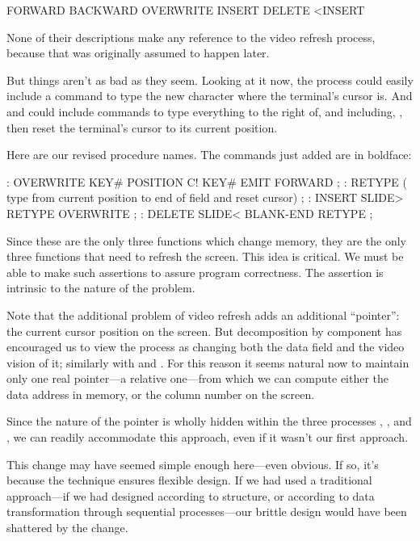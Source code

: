 \begin{Code}
FORWARD
BACKWARD
OVERWRITE
INSERT
DELETE
<INSERT
\end{Code}

None of their descriptions make any reference to the video refresh
process, because that was originally assumed to happen later.

But things aren't as bad as they seem. Looking at it now, the process
 could easily include a command to type the new character
where the terminal's cursor is. And  and  could include
commands to type everything to the right of, and including, ,
then reset the terminal's cursor to its current position.

Here are our revised procedure names. The commands just added
are in boldface:

\begin{Code}
: OVERWRITE KEY# POSITION C! KEY# EMIT FORWARD ;
: RETYPE ( type from current position to
   end of field and reset cursor) ;
: INSERT SLIDE> RETYPE OVERWRITE ;
: DELETE SLIDE< BLANK-END RETYPE ;
\end{Code}

Since these are the only three functions which change memory, they are
the only three functions that need to refresh the screen. This idea is
critical. We must be able to make such assertions to assure program
correctness. The assertion is intrinsic to the nature of the problem.

Note that the additional problem of video refresh adds an additional
``pointer'': the current cursor position on the screen. But decomposition
by component has encouraged us to view the  process as
changing both the data field and the video vision of it; similarly with
 and . For this reason it seems natural now to maintain
only one real pointer---a relative one---from which we can compute either
the data address in memory, or the column number on the screen.

Since the nature of the pointer is wholly hidden within the three
processes , , and , we can readily accommodate
this approach, even if it wasn't our first approach.

This change may have seemed simple enough here---even obvious. If so,
it's because the technique ensures flexible design. If we had used a
traditional approach---if we had designed according to structure, or
according to data transformation through sequential processes---our
brittle design would have been shattered by the change.

